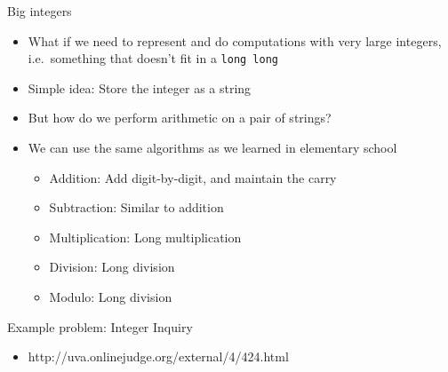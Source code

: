 \documentclass[12pt,t]{beamer}
\newcommand{\bi}{\begin{itemize}}
\newcommand{\ei}{\end{itemize}}
\begin{document}

\begin{frame}{Big integers}
    \bi
        \item What if we need to represent and do computations with very large integers, i.e.\ something that doesn't fit in a \texttt{long long}

        \vspace{5pt}
        \item Simple idea: Store the integer as a string
        \vspace{5pt}
        \item But how do we perform arithmetic on a pair of strings?
        \item We can use the same algorithms as we learned in elementary school
            \bi
                \item Addition: Add digit-by-digit, and maintain the carry
                \item Subtraction: Similar to addition
                \item Multiplication: Long multiplication
                \item Division: Long division
                \item Modulo: Long division
            \ei
    \ei
\end{frame}

\begin{frame}{Example problem: Integer Inquiry}
    \bi
        \item http://uva.onlinejudge.org/external/4/424.html
    \ei
\end{frame}

\end{document}
